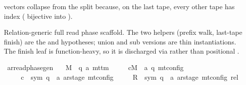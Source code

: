 \begin{isabellebody}
\begin{isamarkuptext}
  vectors collapse from the  split because, on the
  last tape, every other tape has index 
  ( bijective into ).%
\end{isamarkuptext}\isamarkuptrue%
%
\begin{isamarkuptext}%
Relation-generic full read phase scaffold.  The two helpers
  (prefix walk, last-tape finish) are the  and
   hypotheses; union and sub versions are thin
  instantiations.  The finish leaf is function-heavy, so it is
  discharged via  rather than positional
  .%
\end{isamarkuptext}\isamarkuptrue%
\isamarkupfalse%
\ ar{\isacharunderscore}{\kern0pt}read{\isacharunderscore}{\kern0pt}phase{\isacharunderscore}{\kern0pt}gen{\isacharcolon}{\kern0pt}\isanewline
\ \ \ M\ {\isacharcolon}{\kern0pt}{\isacharcolon}{\kern0pt}\ {\isachardoublequoteopen}{\isacharparenleft}{\kern0pt}{\isacharprime}{\kern0pt}q{\isacharcomma}{\kern0pt}\ {\isacharprime}{\kern0pt}a{\isacharparenright}{\kern0pt}\ mttm{\isachardoublequoteclose}\isanewline
\ \ \ \ \ cM\ {\isacharcolon}{\kern0pt}{\isacharcolon}{\kern0pt}\ {\isachardoublequoteopen}{\isacharparenleft}{\kern0pt}{\isacharprime}{\kern0pt}a{\isacharcomma}{\kern0pt}\ {\isacharprime}{\kern0pt}q{\isacharparenright}{\kern0pt}\ mt{\isacharunderscore}{\kern0pt}config{\isachardoublequoteclose}\isanewline
\ \ \ \ \ c{}\ {\isacharcolon}{\kern0pt}{\isacharcolon}{\kern0pt}\ {\isachardoublequoteopen}{\isacharparenleft}{\kern0pt}sym{}{\isacharcomma}{\kern0pt}\ {\isacharprime}{\kern0pt}q\ {\isasymtimes}\ {\isacharprime}{\kern0pt}a\ ar{\isacharunderscore}{\kern0pt}stage{\isacharparenright}{\kern0pt}\ mt{\isacharunderscore}{\kern0pt}config{\isachardoublequoteclose}\isanewline
\ \ \ \ \ R{\isacharprime}{\kern0pt}\ {\isacharcolon}{\kern0pt}{\isacharcolon}{\kern0pt}\ {\isachardoublequoteopen}{\isacharparenleft}{\kern0pt}sym{}{\isacharcomma}{\kern0pt}\ {\isacharprime}{\kern0pt}q\ {\isasymtimes}\ {\isacharprime}{\kern0pt}a\ ar{\isacharunderscore}{\kern0pt}stage{\isacharparenright}{\kern0pt}\ mt{\isacharunderscore}{\kern0pt}config\ rel{\isachardoublequoteclose}\isanewline

\end{isabellebody}
